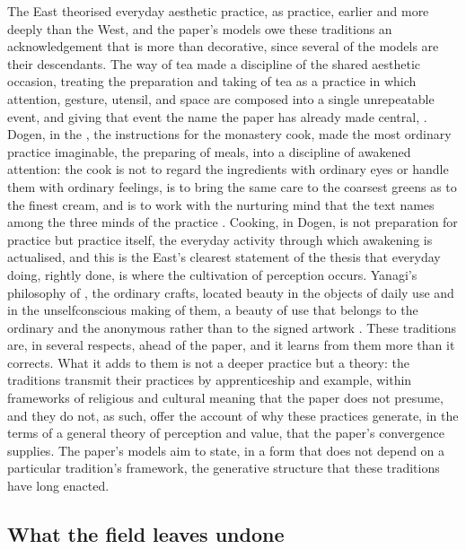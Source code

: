The East theorised everyday aesthetic practice, as practice, earlier and more deeply than the West, and the paper's models owe these traditions an acknowledgement that is more than decorative, since several of the models are their descendants. The way of tea made a discipline of the shared aesthetic occasion, treating the preparation and taking of tea as a practice in which attention, gesture, utensil, and space are composed into a single unrepeatable event, and giving that event the name the paper has already made central, . Dogen, in the , the instructions for the monastery cook, made the most ordinary practice imaginable, the preparing of meals, into a discipline of awakened attention: the cook is not to regard the ingredients with ordinary eyes or handle them with ordinary feelings, is to bring the same care to the coarsest greens as to the finest cream, and is to work with the nurturing mind that the text names among the three minds of the practice \parencite{dogen1996}. Cooking, in Dogen, is not preparation for practice but practice itself, the everyday activity through which awakening is actualised, and this is the East's clearest statement of the thesis that everyday doing, rightly done, is where the cultivation of perception occurs. Yanagi's philosophy of , the ordinary crafts, located beauty in the objects of daily use and in the unselfconscious making of them, a beauty of use that belongs to the ordinary and the anonymous rather than to the signed artwork \parencite{yanagi1972}. These traditions are, in several respects, ahead of the paper, and it learns from them more than it corrects. What it adds to them is not a deeper practice but a theory: the traditions transmit their practices by apprenticeship and example, within frameworks of religious and cultural meaning that the paper does not presume, and they do not, as such, offer the account of why these practices generate, in the terms of a general theory of perception and value, that the paper's convergence supplies. The paper's models aim to state, in a form that does not depend on a particular tradition's framework, the generative structure that these traditions have long enacted.

\subsection{What the field leaves undone}
\label{p23:sub:field-gap}

